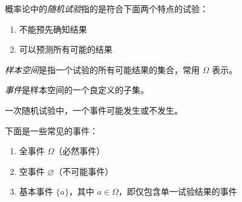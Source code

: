 \documentclass[../main.tex]{subfiles}
\begin{document}
\begin{definition}\label{def:1.2.1}
    概率论中的\emph{随机试验}指的是符合下面两个特点的试验：
    \begin{enumerate}
        \item 不能预先确知结果
        \item 可以预测所有可能的结果
    \end{enumerate}
\end{definition}

\begin{definition}\label{def:1.2.2}
    \emph{样本空间}是指一个试验的所有可能结果的集合，常用 $\Omega$ 表示。
\end{definition}

\begin{definition}\label{def:1.2.3}
    \emph{事件}是样本空间的一个良定义的子集。
\end{definition}

一次随机试验中，一个事件可能发生或不发生。

下面是一些常见的事件：
\begin{enumerate}
    \item 全事件 $\Omega$（必然事件）
    \item 空事件 $\varnothing$（不可能事件）
    \item 基本事件 $\{a\}$，其中 $a\in\Omega$，即仅包含单一试验结果的事件
\end{enumerate}
\end{document}
